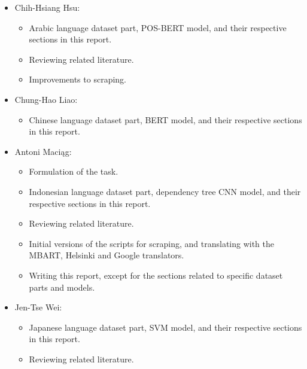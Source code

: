 \documentclass[twocolumn]{article}
\begin{document}
\begin{itemize}

	\item Chih-Hsiang Hsu:
	\begin{itemize}
		\item Arabic language dataset part, POS-BERT model, and their respective sections in this report.
		\item Reviewing related literature.
		\item Improvements to scraping.
	\end{itemize}
	
	\item Chung-Hao Liao:
	\begin{itemize}
		\item Chinese language dataset part, BERT model, and their respective sections in this report.
	\end{itemize}
	
	\item Antoni Maciąg:
	\begin{itemize}
		\item Formulation of the task.
		\item Indonesian language dataset part, dependency tree CNN model, and their respective sections in this report.
		\item Reviewing related literature.
		\item Initial versions of the scripts for scraping, and translating with the MBART, Helsinki and Google translators.
		\item Writing this report, except for the sections related to specific dataset parts and models.
	\end{itemize}
	
	\item Jen-Tse Wei:
	\begin{itemize}
		\item Japanese language dataset part, SVM model, and their respective sections in this report.
		\item Reviewing related literature.
	\end{itemize}
	

	
\end{itemize}
\end{document}
